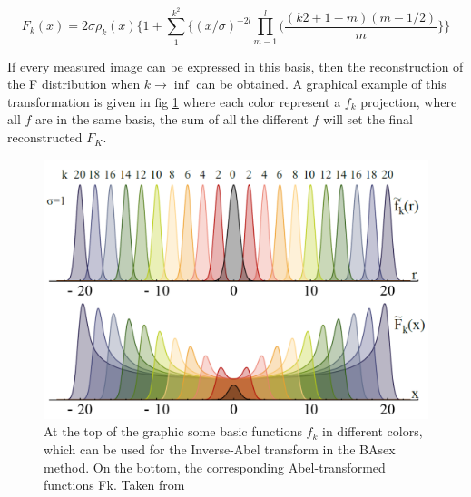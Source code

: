 \begin{equation}
F_{k}(x) = 2\sigma \rho_{k}(x)\lbrace 1 + \sum^{k^{2}}_{1}\lbrace (x/\sigma)^{-2l} \prod^{l}_{m-1}(\dfrac{(k2+ 1-m)(m-1/2)}{m}\rbrace \rbrace
\end{equation}

If every measured image can  be expressed in this basis, then the reconstruction of the F distribution when $k\rightarrow \inf$ can be obtained. A graphical example of this transformation is given in fig \ref{img:Abel} where each color represent a $f_{k}$ projection, where all $f$ are in the same basis, the sum of all the different $f$ will set the final reconstructed $F_{K}$.

\begin{figure}[hbtp]
\label{img:Abel}
 \caption{At the top of the graphic some basic functions $f_{k}$ in different colors, which can be used for the Inverse-Abel transform in the BAsex method. On the bottom, the corresponding  Abel-transformed functions Fk. Taken from \cite{fechner_lutz_aufbau_2011}}
 \centering
 \includegraphics[width=10 cm]{../Images/abel transform pbasex function.png}
 \end{figure}
